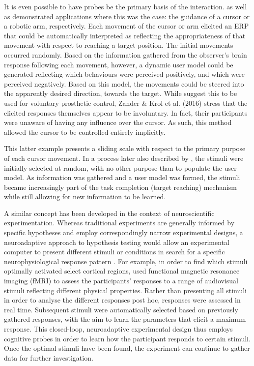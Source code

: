 It is even possible to have probes be the primary basis of the interaction.  as well as  demonstrated applications where this was the case: the guidance of a cursor or a robotic arm, respectively. Each movement of the cursor or arm elicited an ERP that could be automatically interpreted as reflecting the appropriateness of that movement with respect to reaching a target position. The initial movements occurred randomly. Based on the information gathered from the observer's brain response following each movement, however, a dynamic user model could be generated reflecting which behaviours were perceived positively, and which were perceived negatively. Based on this model, the movements could be steered into the apparently desired direction, towards the target. While  suggest this to be used for voluntary prosthetic control, Zander \& Krol et al. (2016) stress that the elicited responses themselves appear to be involuntary. In fact, their participants were unaware of having any influence over the cursor. As such, this method allowed the cursor to be controlled entirely implicitly.

This latter example presents a sliding scale with respect to the primary purpose of each cursor movement. In a process later also described by , the stimuli were initially selected at random, with no other purpose than to populate the user model. As information was gathered and a user model was formed, the stimuli became increasingly part of the task completion (target reaching) mechanism while still allowing for new information to be learned.

A similar concept has been developed in the context of neuroscientific experimentation. Whereas traditional experiments are generally informed by specific hypotheses and employ correspondingly narrow experimental designs, a neuroadaptive approach to hypothesis testing would allow an experimental computer to present different stimuli or conditions in search for a specific neurophysiological response pattern \cite{lorenz2017neuroadaptivebayesian}. For example, in order to find which stimuli optimally activated select cortical regions,  used functional magnetic resonance imaging (fMRI) to assess the participants' responses to a range of audiovisual stimuli reflecting different physical properties. Rather than presenting all stimuli in order to analyse the different responses post hoc, responses were assessed in real time. Subsequent stimuli were automatically selected based on previously gathered responses, with the aim to learn the parameters that elicit a maximum response. This closed-loop, neuroadaptive experimental design thus employs cognitive probes in order to learn how the participant responds to certain stimuli. Once the optimal stimuli have been found, the experiment can continue to gather data for further investigation.

